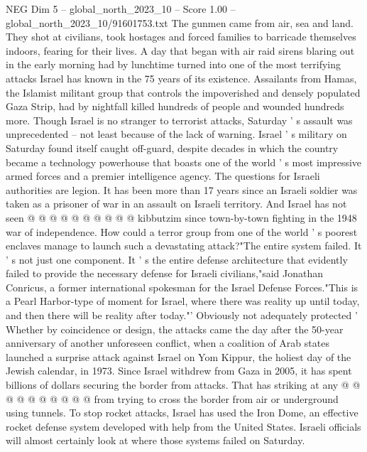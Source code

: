 \begin{textsample}{NEG Dim 5 – global\_north\_2023\_10 – Score 1.00 – global\_north\_2023\_10/91601753.txt}  \label{ex:f5_neg_026}
The gunmen came from air, sea and land.
They shot at civilians, took hostages and forced families to barricade themselves indoors, fearing for their lives.
A day that began with air raid sirens blaring out in the early morning had by lunchtime turned into one of the most terrifying attacks Israel has known in the 75 years of its existence.
Assailants from Hamas, the Islamist militant group that controls the impoverished and densely populated Gaza Strip, had by nightfall killed hundreds of people and wounded hundreds more.
Though Israel is no stranger to terrorist attacks, Saturday ' s assault was unprecedented -- not least because of the lack of warning.
Israel ' s military on Saturday found itself caught off-guard, despite decades in which the country became a technology powerhouse that boasts one of the world ' s most impressive armed forces and a premier intelligence agency.
The questions for Israeli authorities are legion.
It has been more than 17 years since an Israeli soldier was taken as a prisoner of war in an assault on Israeli territory.
And Israel has not seen @ @ @ @ @ @ @ @ @ @ kibbutzim since town-by-town fighting in the 1948 war of independence.
How could a terror group from one of the world ' s poorest enclaves manage to launch such a devastating attack?"The entire system failed.
It ' s not just one component.
It ' s the entire defense architecture that evidently failed to provide the necessary defense for Israeli civilians,"said Jonathan Conricus, a former international spokesman for the Israel Defense Forces."This is a Pearl Harbor-type of moment for Israel, where there was reality up until today, and then there will be reality after today."' Obviously not adequately protected ' Whether by coincidence or design, the attacks came the day after the 50-year anniversary of another unforeseen conflict, when a coalition of Arab states launched a surprise attack against Israel on Yom Kippur, the holiest day of the Jewish calendar, in 1973.
Since Israel withdrew from Gaza in 2005, it has spent billions of dollars securing the border from attacks.
That has striking at any @ @ @ @ @ @ @ @ @ @ from trying to cross the border from air or underground using tunnels.
To stop rocket attacks, Israel has used the Iron Dome, an effective rocket defense system developed with help from the United States.
Israeli officials will almost certainly look at where those systems failed on Saturday.

\end{textsample}
